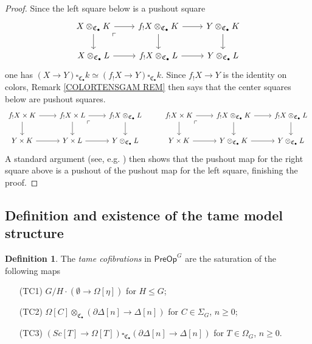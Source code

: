 \documentclass[a4paper,10pt]{article}%
\numberwithin{equation}{section}
\numberwithin{figure}{section}
\theoremstyle{definition} %
\newtheorem{definition}[equation]{Definition}%
\newcommand{\1}{\ensuremath{\mathbbm 1}}%
\begin{document}
\begin{proof}
Since the left square below is a pushout square
\[
\begin{tikzcd}
	X \otimes_{\mathfrak{C}_{\bullet}} K \ar{r} \ar{d} 
	\arrow[dr, phantom, "\ulcorner", very near start]
&
	f_! X \otimes_{\mathfrak{C}_{\bullet}} K \ar{r} \ar{d} 
&
	Y \otimes_{\mathfrak{C}_{\bullet}} K \ar{d}
\\
	X \otimes_{\mathfrak{C}_{\bullet}} L \ar{r} 
&
	f_! X \otimes_{\mathfrak{C}_{\bullet}} L \ar{r} 
&
	Y \otimes_{\mathfrak{C}_{\bullet}} L
\end{tikzcd}
\]
one has
$(X \to Y) \square_{\mathfrak{C}_{\bullet}} k 
\simeq 
(f_!X \to Y) \square_{\mathfrak{C}_{\bullet}} k$.
Since $f_!X \to Y$ is the identity on colors,
Remark \ref{COLORTENSGAM REM} then says that the center squares below are pushout squares.
\[
\begin{tikzcd}
	f_! X \times K 
	\ar{r} \ar{d} 
&
	f_! X \times L
	\ar{r} \ar{d} 
	\arrow[dr, phantom, "\ulcorner", very near start] 
&
	f_! X \otimes_{\mathfrak{C}_{\bullet}} L
	\ar{d}
&
	f_! X \times K \ar{r} \ar{d} 
	\arrow[dr, phantom, "\ulcorner", very near start] 
&
	f_! X \otimes_{\mathfrak{C}_{\bullet}} K 
	\ar{r} \ar{d} 
&
	f_! X \otimes_{\mathfrak{C}_{\bullet}} L
	\ar{d}
\\
	Y \times K 
	\ar{r} 
&
	Y \times L
	\ar{r}
&
	Y \otimes_{\mathfrak{C}_{\bullet}} L
&
	Y \times K 
	\ar{r} 
&
	Y \otimes_{\mathfrak{C}_{\bullet}} K
	\ar{r}
&
	Y \otimes_{\mathfrak{C}_{\bullet}} L
\end{tikzcd}
\]
A standard argument
(see, e.g. \cite[Obs. 5.1]{RV14})
then shows that the pushout map for the right square above is a pushout of the pushout map for the left square, 
finishing the proof.	
\end{proof}





\subsection{Definition and existence of the tame model structure}
\label{TAMEDEFEX SEC}

\begin{definition}\label{TAMEGENCOF DEF}
	The \emph{tame cofibrations} in $\mathsf{PreOp}^G$
	are the saturation of the following maps
	\begin{itemize}
		\item[(TC1)] $G/H \cdot \left(\emptyset \to\Omega[\eta]\right)$ for $H\leq G$;
		\item[(TC2)] 
		$\Omega[C] \otimes_{\mathfrak{C}_{\bullet}} \left(\partial \Delta[n] \to \Delta[n]\right)$ for $C \in \Sigma_G$, $n \geq 0$;
		\item[(TC3)] 
		$\left( Sc[T] \to \Omega[T] \right) 
		\square_{\mathfrak{C}_{\bullet}} 
		\left(\partial \Delta[n] \to \Delta[n]\right)$ for $T \in \Omega_G$, $n \geq 0$.
	\end{itemize}
\end{definition}
\end{document}
